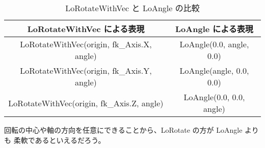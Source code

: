 \begin{table}[H]
\caption{LoRotateWithVec と LoAngle の比較}
\label{tbl:fkAngle1}
\begin{center}
\begin{tabular}{|c|c|}
\hline
LoRotateWithVec による表現 & LoAngle による表現 \\ \hline \hline
LoRotateWithVec(origin, fk\_Axis.X, angle) & LoAngle(0.0, angle, 0.0) \\ \hline
LoRotateWithVec(origin, fk\_Axis.Y, angle) & LoAngle(angle, 0.0, 0.0) \\ \hline
LoRotateWithVec(origin, fk\_Axis.Z, angle) & LoAngle(0.0, 0.0, angle) \\ \hline
\end{tabular}
\end{center}
\end{table}

回転の中心や軸の方向を任意にできることから、LoRotate の方が LoAngle よりも
柔軟であるといえるだろう。


